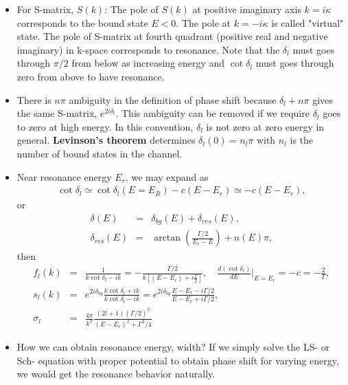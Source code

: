 \documentclass[10pt]{article}
\newcommand{\bea}{\begin{eqnarray}}
\newcommand{\eea}{\end{eqnarray}}
\newcommand{\no}{\nonumber \\}
\begin{document}
\begin{itemize}
     
     
\item For S-matrix, $S(k)$: The pole of $S(k)$ at  
positive imaginary axis $k=i\kappa $ corresponds to the bound state $E<0$.
The pole at $k=-i\kappa$ is called "virtual" state. The pole of S-matrix
at fourth quadrant (positive real and negative imaginary) in k-space 
corresponds to resonance. Note that the $\delta_l$ must goes through $\pi/2$
from below as increasing energy and $\cot\delta_l$ must goes through
zero from above to have resonance.

\item There is $n\pi$ ambiguity in the definition of phase shift because 
$\delta_l+n\pi $ gives the same S-matrix, $e^{2i\delta_l}$. This ambiguity
can be removed if we require $\delta_l$ goes to zero at high energy. 
In this convention, $\delta_l$ is not zero at zero energy in general.
{\bf Levinson's theorem} determines $\delta_l(0)=n_l\pi$ with $n_l$ is the number 
of bound states in the channel.

\item Near resonance energy $E_r$, we may expand as
\bea 
\cot\delta_l \simeq \cot\delta_l(E=E_R)-c(E-E_r)\simeq -c(E-E_r),
\eea 
or
\bea 
\delta(E)&=&\delta_{bg}(E)+\delta_{res}(E),\no 
\delta_{res}(E)&=&\arctan(\frac{\Gamma/2}{E_r-E})+n(E)\pi, 
\eea 
then
\bea 
f_l(k)&=&\frac{1}{k\cot\delta_l-ik}=-\frac{\Gamma/2}{k\left[(E-E_r)+i\frac{\Gamma}{2}\right] },
\quad \frac{d(\cot\delta_l)}{dE}|_{E=E_r}=-c=-\frac{2}{\Gamma},\no 
s_l(k)&=&e^{2i\delta_{bg}}\frac{k\cot\delta_l+ik}{k\cot\delta_l-ik}
       =e^{2i\delta_{bg}}\frac{E-E_r-i\Gamma/2}{E-E_r+i\Gamma/2} ,\no 
\sigma_l&=&\frac{4\pi}{k^2}\frac{(2l+1)(\Gamma/2)^2}{(E-E_r)^2+\Gamma^2/4}
\eea 

\item How we can obtain resonance energy, width? If we simply solve the LS- or Sch- equation
      with proper potential to obtain phase shift for varying energy, 
      we would get the resonance behavior naturally.

\end{itemize}
\end{document}
